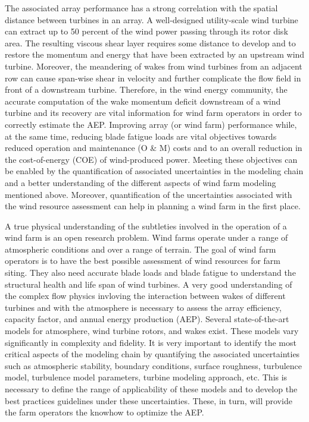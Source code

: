 \documentclass[]{aiaa-tc}%
\begin{document}
The associated array performance has a strong correlation with the spatial distance between turbines in an array. A well-designed utility-scale wind turbine can extract up to 50 percent of the wind power passing through its rotor disk area. The resulting viscous shear layer requires some distance to develop and to restore the momentum and energy that have been extracted by an upstream wind turbine. Moreover, the meandering of wakes from wind turbines from an adjacent row can cause span-wise shear in velocity and further complicate the flow field in front of a downstream turbine. Therefore, in the wind energy community, the accurate computation of the wake momentum deficit downstream of a wind turbine and its recovery are vital information for wind farm operators in order to correctly estimate the AEP. Improving array (or wind farm) performance while, at the same time, reducing blade fatigue loads are vital objectives towards reduced operation and maintenance (O \& M) costs and to an overall reduction in the cost-of-energy (COE) of wind-produced power. Meeting these objectives can be enabled by the quantification of associated uncertainties in the modeling chain and a better understanding of the different aspects of wind farm modeling mentioned above. Moreover, quantification of the uncertainties associated with the wind resource assessment can help in planning a wind farm in the first place.

A true physical understanding of the subtleties involved in the operation of a wind farm is an open research problem. Wind farms operate under a range of atmospheric conditions and over a range of terrain. The goal of wind farm operators is to have the best possible assessment of wind resources for farm siting. They also need accurate blade loads and blade fatigue to understand the structural health and life span of wind turbines. A very good understanding of the complex flow physics invloving the interaction between wakes of different turbines and with the atmosphere is necessary to assess the array efficiency, capacity factor, and annual energy production (AEP). Several state-of-the-art models for atmosphere, wind turbine rotors, and wakes exist. These models vary significantly in complexity and fidelity. It is very important to identify the most critical aspects of the modeling chain by quantifying the associated uncertainties such as atmospheric stability, boundary conditions, surface roughness, turbulence model, turbulence model parameters, turbine modeling approach, etc. This is necessary to define the range of applicability of these models and to develop the best practices guidelines under these uncertainties. These, in turn, will provide the farm operators the knowhow to optimize the AEP. 
\end{document}
